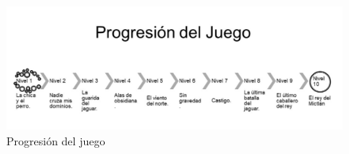 \begin{figure}
  \centering
   \includegraphics[width=0.8 \textwidth]{05TrabajoRealizado/01DocDiseno02/imagenes/ProgresJuego}
  \caption{Progresión del juego}
  \label{fig:ProgreNiveles}
\end{figure} 

